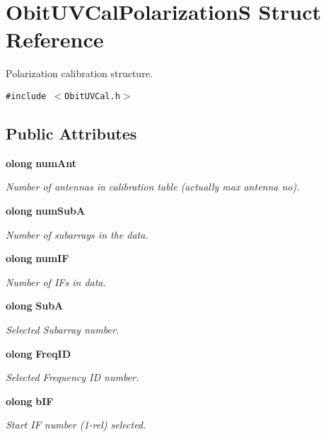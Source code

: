 \section{Obit\-UVCal\-Polarization\-S Struct Reference}
\label{structObitUVCalPolarizationS}
Polarization calibration structure.  


{\tt \#include $<$Obit\-UVCal.h$>$}

\subsection*{Public Attributes}
\begin{CompactItemize}
\item 
{\bf olong} {\bf num\-Ant}
\begin{CompactList}\small\item\em Number of antennas in calibration table (actually max antenna no). \item\end{CompactList}\item 
{\bf olong} {\bf num\-Sub\-A}
\begin{CompactList}\small\item\em Number of subarrays in the data. \item\end{CompactList}\item 
{\bf olong} {\bf num\-IF}
\begin{CompactList}\small\item\em Number of IFs in data. \item\end{CompactList}\item 
{\bf olong} {\bf Sub\-A}
\begin{CompactList}\small\item\em Selected Subarray number. \item\end{CompactList}\item 
{\bf olong} {\bf Freq\-ID}
\begin{CompactList}\small\item\em Selected Frequency ID number. \item\end{CompactList}\item 
{\bf olong} {\bf b\-IF}
\begin{CompactList}\small\item\em Start IF number (1-rel) selected. \item\end{CompactList}\item 

\end{CompactItemize}
